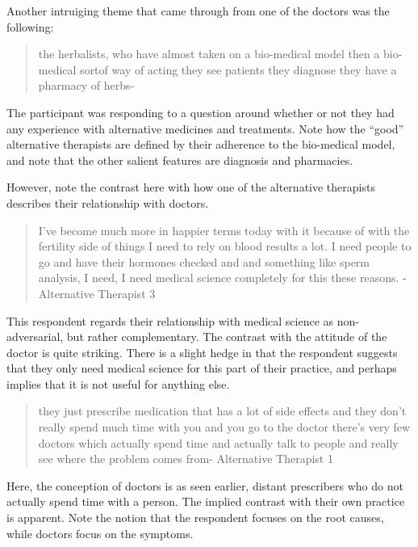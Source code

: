 Another intruiging theme that came through from one of the doctors was the following: 

\begin{quotation}
  the herbalists, who have almost taken on a bio-medical model then a bio-medical sortof way of acting they see patients they diagnose they have a pharmacy of herbs-

\end{quotation}

The participant was responding to a question around whether or not they had any experience with alternative medicines and treatments. Note how the ``good'' alternative therapists are defined by their adherence to the bio-medical model, and note that the other salient features are diagnosis and pharmacies. 

However, note the contrast here with how one of the alternative therapists describes their relationship with doctors. 

\begin{quotation}
  I've become much more in happier terms today with it because of with the fertility side of things I need to rely on blood results a lot. I need people to go and have their hormones checked and and something like sperm analysis, I need, I need medical science completely for this these reasons.
- Alternative Therapist 3
\end{quotation}

This respondent regards their relationship with medical science as non-adversarial, but rather complementary. The contrast with the attitude of the doctor is quite striking. There is a slight hedge in that the respondent suggests that they only need medical science for this part of their practice, and perhaps implies that it is not useful for anything else. 


\begin{quotation}
  they just prescribe medication that has a lot of side effects and they don't really spend much time with you and you go to the doctor there's very few doctors which actually spend time and actually talk to people and really see where the problem comes from-
Alternative Therapist 1
\end{quotation}

Here, the conception of doctors is as seen earlier, distant prescribers who do not actually spend time with a person. The implied contrast with their own practice is apparent. Note the notion that the respondent focuses on the root causes, while doctors focus on the symptoms. 

